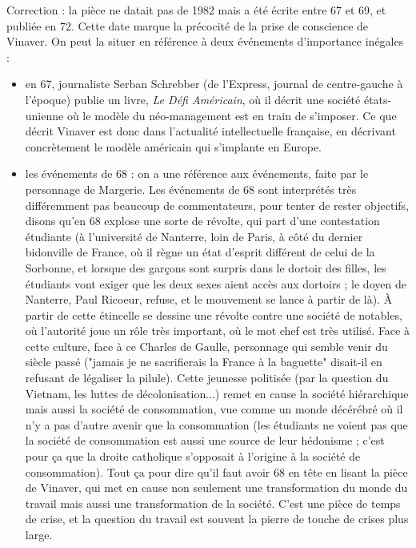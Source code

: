 \documentclass[a4paper,12pt]{book}
\begin{document}
\par Correction : la pièce ne datait pas de 1982 mais a été écrite entre 67 et 69, et publiée en 72. Cette date marque la précocité de la prise de conscience de Vinaver. On peut la situer en référence à deux événements d'importance inégales :\begin{itemize}
\item en 67, journaliste Serban Schrebber (de l'Express, journal de centre-gauche à l'époque) publie un livre, \textit{Le Défi Américain}, où il décrit une société états-unienne où le modèle du néo-management est en train de s'imposer. Ce que décrit Vinaver est donc dans l'actualité intellectuelle française, en décrivant concrètement le modèle américain qui s'implante en Europe.
\item les événements de 68 : on a une référence aux événements, faite par le personnage de Margerie. Les événements de 68 sont interprétés très différemment pas beaucoup de commentateurs, pour tenter de rester objectifs, disons qu'en 68 explose une sorte de révolte, qui part d'une contestation étudiante (à l'université de Nanterre, loin de Paris, à côté du dernier bidonville de France, où il règne un état d'esprit différent de celui de la Sorbonne, et lorsque des garçons sont surpris dans le dortoir des filles, les étudiants vont exiger que les deux sexes aient accès aux dortoirs ; le doyen de Nanterre, Paul Ricoeur, refuse, et le mouvement se lance à partir de là). À partir de cette étincelle se dessine une révolte contre une société de notables, où l'autorité joue un rôle très important, où le mot chef est très utilisé. Face à cette culture, face à ce Charles de Gaulle, personnage qui semble venir du siècle passé ("jamais je ne sacrifierais la France à la baguette" disait-il en refusant de légaliser la pilule). Cette jeunesse politisée (par la question du Vietnam, les luttes de décolonisation...) remet en cause la société hiérarchique mais aussi la société de consommation, vue comme un monde décérébré où il n'y a pas d'autre avenir que la consommation (les étudiants ne voient pas que la société de consommation est aussi une source de leur hédonisme ; c'est pour ça que la droite catholique s'opposait à l'origine à la société de consommation). Tout ça pour dire qu'il faut avoir 68 en tête en lisant la pièce de Vinaver, qui met en cause non seulement une transformation du monde du travail mais aussi une transformation de la société. C'est une pièce de temps de crise, et la question du travail est souvent la pierre de touche de crises plus large.
\end{itemize}
\end{document}
